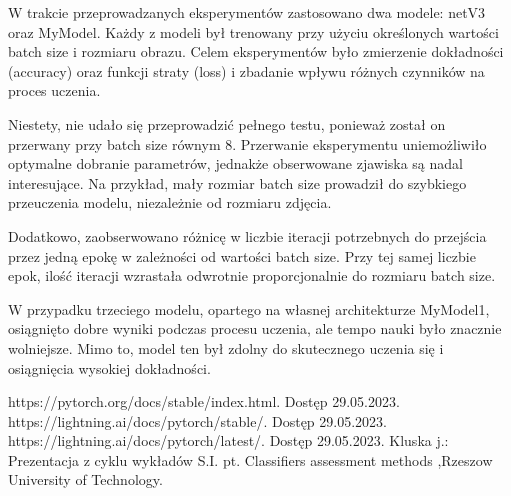 \documentclass[12pt,twoside]{article}
\begin{document}
W trakcie przeprowadzanych eksperymentów zastosowano dwa modele: netV3 oraz MyModel. Każdy z modeli był trenowany przy użyciu określonych wartości batch size i rozmiaru obrazu. Celem eksperymentów było zmierzenie dokładności (accuracy) oraz funkcji straty (loss) i zbadanie wpływu różnych czynników na proces uczenia.

Niestety, nie udało się przeprowadzić pełnego testu, ponieważ został on przerwany przy batch size równym 8. Przerwanie eksperymentu uniemożliwiło optymalne dobranie parametrów, jednakże obserwowane zjawiska są nadal interesujące. Na przykład, mały rozmiar batch size prowadził do szybkiego przeuczenia modelu, niezależnie od rozmiaru zdjęcia.

Dodatkowo, zaobserwowano różnicę w liczbie iteracji potrzebnych do przejścia przez jedną epokę w zależności od wartości batch size. Przy tej samej liczbie epok, ilość iteracji wzrastała odwrotnie proporcjonalnie do rozmiaru batch size.

W przypadku trzeciego modelu, opartego na własnej architekturze MyModel1, osiągnięto dobre wyniki podczas procesu uczenia, ale tempo nauki było znacznie wolniejsze. Mimo to, model ten był zdolny do skutecznego uczenia się i osiągnięcia wysokiej dokładności.


\clearpage
{}


\begin{thebibliography}{4}
 https://pytorch.org/docs/stable/index.html. Dostęp 29.05.2023.
 https://lightning.ai/docs/pytorch/stable/. Dostęp 29.05.2023.
 https://lightning.ai/docs/pytorch/latest/. Dostęp 29.05.2023.
 Kluska j.: Prezentacja z cyklu wykładów S.I. pt. Classifiers assessment methods
,Rzeszow University of Technology.

\end{thebibliography}
\end{document}
